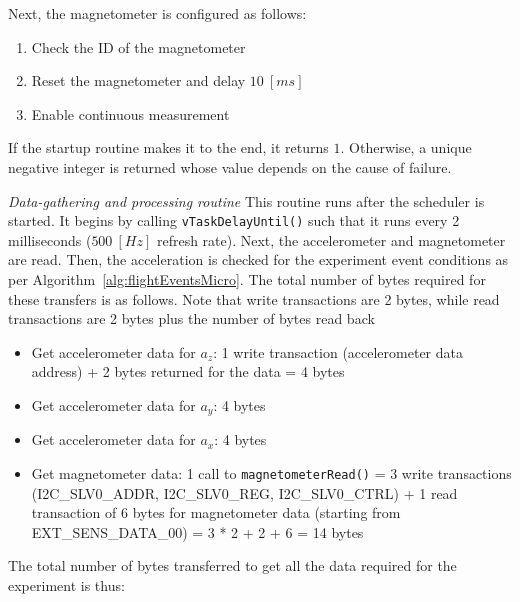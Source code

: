 \documentclass{article}
\begin{document}
Next, the magnetometer is configured as follows:

\begin{enumerate}
	\item Check the ID of the magnetometer
	
	\item Reset the magnetometer and delay $10 \ [ms]$
	
	\item Enable continuous measurement
\end{enumerate}

If the startup routine makes it to the end, it returns $1$. Otherwise, a unique negative integer is returned whose value depends on the cause of failure.
\newline
\newline

\textit{Data-gathering and processing routine}
\newline
This routine runs after the scheduler is started. It begins by calling \texttt{vTaskDelayUntil()} such that it runs every 2 milliseconds ($500 \ [Hz]$ refresh rate). Next, the accelerometer and magnetometer are read. Then, the acceleration is checked for the experiment event conditions as per Algorithm~\ref{alg:flightEventsMicro}.
\newline
\newline
The total number of bytes required for these transfers is as follows. Note that write transactions are 2 bytes, while read transactions are 2 bytes plus the number of bytes read back
\begin{itemize}
	\item Get accelerometer data for $a_z$: 1 write transaction (accelerometer data address) + 2 bytes returned for the data = 4 bytes
	
	\item Get accelerometer data for $a_y$: 4 bytes
	
	\item Get accelerometer data for $a_x$: 4 bytes
	
	\item Get magnetometer data: 1 call to \texttt{magnetometerRead()} = 3 write transactions (I2C\_SLV0\_ADDR, I2C\_SLV0\_REG, I2C\_SLV0\_CTRL) + 1 read transaction of 6 bytes for magnetometer data (starting from EXT\_SENS\_DATA\_00) = 3 * 2 + 2 + 6 = 14 bytes
\end{itemize}

The total number of bytes transferred to get all the data required for the experiment is thus:
\end{document}
